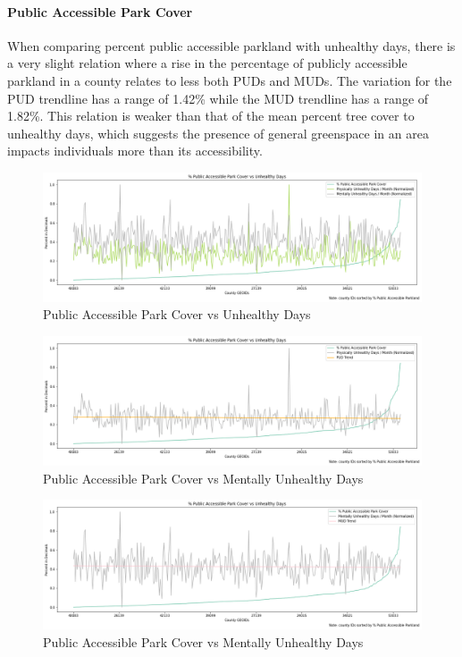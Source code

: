 \documentclass{article}
\begin{document}
\paragraph{Public Accessible Park Cover}
When comparing percent public accessible parkland with unhealthy days, there is a very slight relation where a rise in the percentage of publicly accessible parkland in a county relates to less both PUDs and MUDs. The variation for the PUD trendline has a range of 1.42\% while the MUD trendline has a range of 1.82\%. This relation is weaker than that of the mean percent tree cover to unhealthy days, which suggests the presence of general greenspace in an area impacts individuals more than its accessibility. 


\begin{figure}[H]
    \centering
    \includegraphics[scale = 0.35]{park_phys_ment.png}
    \caption{Public Accessible Park Cover vs Unhealthy Days}
    \label{fig:my_label}
\end{figure}




\begin{figure}[H]
    \centering
    \includegraphics[scale = 0.35]{park_cover_phys.png}
    \caption{Public Accessible Park Cover vs Mentally Unhealthy Days}
    \label{fig:my_label}
\end{figure}



\begin{figure}[H]
    \centering
    \includegraphics[scale = 0.35]{park_cover_ment.png}
    \caption{Public Accessible Park Cover vs Mentally Unhealthy Days}
    \label{fig:my_label}
\end{figure}
\end{document}
